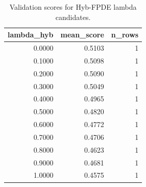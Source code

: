 \begin{table}[t]
\caption{Validation scores for Hyb-FPDE lambda candidates.}
\label{tab:lambda_distribution_computed}
\centering
\begin{tabular}{rrr}
\toprule
lambda\_hyb & mean\_score & n\_rows \\
\midrule
0.0000 & 0.5103 & 1 \\
0.1000 & 0.5098 & 1 \\
0.2000 & 0.5090 & 1 \\
0.3000 & 0.5049 & 1 \\
0.4000 & 0.4965 & 1 \\
0.5000 & 0.4820 & 1 \\
0.6000 & 0.4772 & 1 \\
0.7000 & 0.4706 & 1 \\
0.8000 & 0.4623 & 1 \\
0.9000 & 0.4681 & 1 \\
1.0000 & 0.4575 & 1 \\
\bottomrule
\end{tabular}

\end{table}
